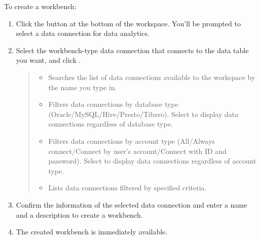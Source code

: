 \documentclass[letterpaper,10pt,english]{sphinxmanual}
\begin{document}
To create a workbench:
\begin{enumerate}
\def\theenumi{\arabic{enumi}}
\def\labelenumi{\theenumi .}
\makeatletter\def\p@enumii{\p@enumi \theenumi .}\makeatother
\item {} 
Click the  button at the bottom of the workspace. You’ll be prompted to select a data connection for data analytics.
\begin{quote}

\begin{figure}[H]
\centering

\noindent{}
\end{figure}
\end{quote}

\item {} 
Select the workbench-type data connection that connects to the data table you want, and click .
\begin{quote}

\begin{figure}[H]
\centering

\noindent{}
\end{figure}
\begin{itemize}
\item {} 
 Searches the list of data connections available to the workspace by the name you type in.

\item {} 
 Filters data connections by database type (Oracle/MySQL/Hive/Presto/Tibero). Select  to display data connections regardless of database type.

\item {} 
 Filters data connections by account type (All/Always connect/Connect by user’s account/Connect with ID and password). Select  to display data connections regardless of account type.

\item {} 
 Lists data connections filtered by specified criteria.

\end{itemize}
\end{quote}

\item {} 
Confirm the information of the selected data connection and enter a name and a description to create a workbench.
\begin{quote}

\begin{figure}[H]
\centering

\noindent{}
\end{figure}
\end{quote}

\item {} 
The created workbench is immediately available.

\end{enumerate}
\end{document}
